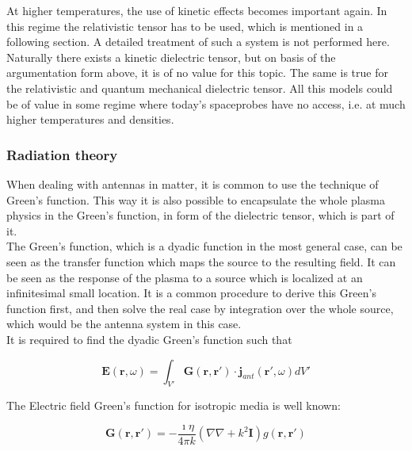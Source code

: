 \documentclass[two-column,ras]{agutex}
\begin{document}
\begin{article}
At higher temperatures, the use of kinetic effects becomes important again. In this regime the relativistic tensor has to be used, which is mentioned in a following section. A detailed treatment of such a system is not performed here.\\

Naturally there exists a kinetic dielectric tensor, but on basis of the argumentation form above, it is of no value for this topic. The same is true for the relativistic and quantum mechanical dielectric tensor. All this models could be of value in some regime where today's spaceprobes have no access, i.e. at much higher temperatures and densities. \\

\subsubsection{Radiation theory}
When dealing with antennas in matter, it is common to use the technique of Green's function. This way it is also possible to encapsulate the whole plasma physics in the Green's function, in form of the dielectric tensor, which is part of it.\\

The Green's function, which is a dyadic function in the most general case, can be seen as the transfer function which maps the source to the resulting field. It can be seen as the response of the plasma to a source which is localized at an infinitesimal small location. It is a common procedure to derive this Green's function first, and then solve the real case by integration over the whole source, which would be the antenna system in this case.\\

 It is required to find the dyadic Green's function such that

\begin{equation}
    \mathbf{E}(\mathbf{r},\omega)=\int_{V'} \mathbf{G}(\mathbf{r},\mathbf{r'})\cdot \mathbf{j}_{ant}(\mathbf{r'},\omega) dV'\label{def_greens_function}
\end{equation}

The Electric field Green's function for isotropic media is well known:

\begin{equation}
 \mathbf{G}(\mathbf{r},\mathbf{r'}) = -\frac{\imath \eta }{4 \pi k} \left(  \nabla  \nabla   + k^2  \mathbf{I} \right) g(\mathbf{r},\mathbf{r'})
\end{equation}


\end{article}
\end{document}
